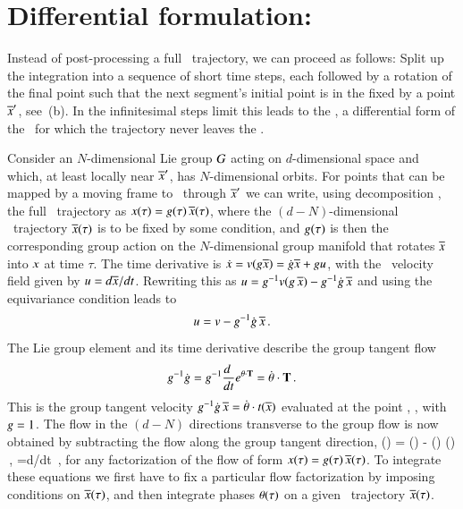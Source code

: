 \documentclass[preprint,number,sort&compress]{elsarticle}
\begin{document}
\section{\label{sec:MovFrameODE}Differential formulation: \Mslices}


Instead of post-processing a full \statesp\ trajectory, we
can proceed as follows: Split up the integration into a
sequence of short time steps, each followed by a rotation of
the final point such that the next segment's initial point is
in the {\em \slice} fixed by a point ${\overline{x}'} $, see
\,(b). In the infinitesimal steps limit
this leads to the \emph{\mslices}, a differential form of the
\mframes\ for which the trajectory never leaves the
\reducedsp.

Consider an $N$-dimensional Lie group $G$ acting on
$d$-dimensional space and which, at least locally near
${\overline{x}'}$, has $N$-dimensional orbits. For points that can be
mapped by a moving frame to \slice\ through ${\overline{x}'}$ we can
write, using decomposition , the full
\statesp\ trajectory as $x(\tau)=
g(\tau)\,\overline{x}(\tau)$, where the
$(d\!-\!N)$-dim\-ens\-ion\-al \reducedsp\ trajectory
$\overline{x}(\tau)$ is to be fixed by some condition, and
$g(\tau)$ is then the corresponding group action on the
$N$-dim\-ens\-ion\-al group manifold that
rotates $\overline{x}$ into $x$ at time $\tau$. The time
derivative is $\dot{x}= v(g\overline{x}) =
\dot{g}\overline{x} + gu$, with the \reducedsp\
velocity field given by $u={d\overline{x}}/{dt}$. Rewriting
this as $ u = g^{-1} v(g \, \overline{x}) -
g^{-1} \dot{g} \, \overline{x} $ and using the
equivariance condition  leads to
\[
u = v - g^{-1} \dot{g} \, \overline{x}
\,.
\]
The Lie group element  and its time
derivative describe the group tangent flow
\[
g^{-1} \dot{g} =
g^{-1}\frac{d~}{dt} e^{{\bf \theta} \cdot \mathbf{T} } =
\dot{{\bf \theta}} \cdot \mathbf{T}
\,.
\]
This is the group tangent velocity $g^{-1} \dot{g}
\, \overline{x} = \dot{{\bf \theta}} \cdot t(\overline{x})$
evaluated at the point \sspRed, \ie, with ${g} = 1$.
 The flow in the $(d\!-\!N)$
directions transverse to the group flow is now obtained by
subtracting the flow along the group tangent direction,
\beq
\velRed(\sspRed) = \vel(\sspRed)
      - \dot{\gSpace}(\sspRed) \cdot \groupTan(\sspRed)
\,,\qquad
\velRed={d\sspRed}/{dt}
\,,
for any factorization of the flow of form $x(\tau)=
g(\tau)\, \overline{x}(\tau)$. To integrate these equations
we first have to fix a particular flow factorization by
imposing conditions on $\overline{x}(\tau)$, and then integrate
phases ${\bf \theta}(\tau)$ on a given \reducedsp\ trajectory
$\overline{x}(\tau)$.
\end{document}
